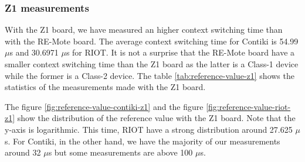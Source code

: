 \subsubsection{Z1 measurements}
With the Z1 board, we have measured an higher context switching time than with the RE-Mote board. The average context switching time for Contiki is 54.99 $\mu$s and 30.6971 $\mu$s for RIOT.
It is not a surprise that the RE-Mote board have a smaller context switching time than the Z1 board as the latter is a Class-1 device while the former is a Class-2 device.
The table \ref{tab:reference-value-z1} shows the statistics of the measurements made with the Z1 board.



The figure \ref{fig:reference-value-contiki-z1} and the figure \ref{fig:reference-value-riot-z1} show the distribution of the reference value with the Z1 board.
Note that the y-axis is logarithmic.
This time, RIOT have a strong distribution around 27.625 $\mu$s.
For Contiki, in the other hand, we have the majority of our measurements around 32 $\mu$s but some measurements are above 100 $\mu$s.

